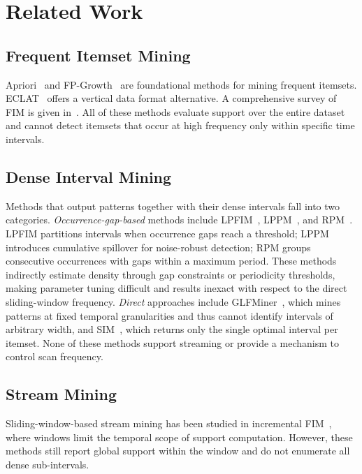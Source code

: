 \section{Related Work}

\subsection{Frequent Itemset Mining}

Apriori~\cite{agrawal1994fast} and FP-Growth~\cite{han2000mining}
are foundational methods for mining frequent itemsets.
ECLAT~\cite{zaki1997new} offers a vertical data format alternative.
A comprehensive survey of FIM is given in~\cite{fournier2017survey}.
All of these methods evaluate support over the entire dataset and
cannot detect itemsets that occur at high frequency only within
specific time intervals.

\subsection{Dense Interval Mining}

Methods that output patterns together with their dense intervals
fall into two categories.
\textit{Occurrence-gap-based} methods include
LPFIM~\cite{yin2014lpfim}, LPPM~\cite{saleh2011lppm}, and
RPM~\cite{kiran2017rpm}.
LPFIM partitions intervals when occurrence gaps reach a threshold;
LPPM introduces cumulative spillover for noise-robust detection;
RPM groups consecutive occurrences with gaps within a maximum period.
These methods indirectly estimate density through gap constraints
or periodicity thresholds, making parameter tuning difficult and
results inexact with respect to the direct sliding-window frequency.
\textit{Direct} approaches include GLFMiner~\cite{fournierviger2021glf},
which mines patterns at fixed temporal granularities and thus cannot
identify intervals of arbitrary width, and SIM~\cite{kiran2015sim},
which returns only the single optimal interval per itemset.
None of these methods support streaming or provide a mechanism
to control scan frequency.

\subsection{Stream Mining}

Sliding-window-based stream mining has been studied in
incremental FIM~\cite{lee2001sliding,leung2006dstree},
where windows limit the temporal scope of support computation.
However, these methods still report global support within the window
and do not enumerate all dense sub-intervals.

